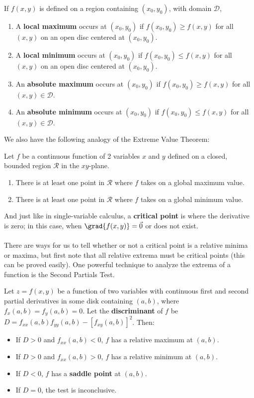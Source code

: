 \documentclass[12pt]{article}
\begin{document}
If $f(x,y)$ is defined on a region containing $(x_0,y_0)$, with domain $\mathcal{D}$,
\begin{enumerate}
\item A \textbf{local maximum} occurs at $(x_0,y_0)$ if $f(x_0,y_0) \ge f(x,y)$ for all $(x,y)$ on an open disc centered at $(x_0,y_0)$.
\item A \textbf{local minimum} occurs at $(x_0,y_0)$ if $f(x_0,y_0) \le f(x,y)$ for all $(x,y)$ on an open disc centered at $(x_0,y_0)$.
\item An \textbf{absolute maximum} occurs at $(x_0,y_0)$ if $f(x_0,y_0) \ge f(x,y)$ for all $(x,y) \in \mathcal{D}$.
\item An \textbf{absolute minimum} occurs at $(x_0,y_0)$ if $f(x_0,y_0) \le f(x,y)$ for all $(x,y) \in \mathcal{D}$.
\end{enumerate}

We also have the following analogy of the Extreme Value Theorem:
\begin{theorem}
Let $f$ be a continuous function of 2 variables $x$ and $y$ defined on a closed, bounded region $\mathcal{R}$ in the $xy$-plane.
\begin{enumerate}
\item There is at least one point in $\mathcal{R}$ where $f$ takes on a global maximum value.
\item There is at least one point in $\mathcal{R}$ where $f$ takes on a global minimum value.
\end{enumerate}
\end{theorem}

And just like in single-variable calculus, a \textbf{critical point} is where the derivative is zero; in this case, when $\grad{f(x,y)} = \vec{0}$ or does not exist. \\ \\
There are ways for us to tell whether or not a critical point is a relative minima or maxima, but first note that all relative extrema must be critical points (this can be proved easily). One powerful technique to analyze the extrema of a function is the Second Partials Test.
\begin{theorem}
Let $z = f(x,y)$ be a function of two variables with continuous first and second partial derivatives in some disk containing $(a,b)$, where $f_x(a,b) = f_y(a,b) = 0$. Let the \textbf{discriminant} of $f$ be $D = f_{xx}(a,b)f_{yy}(a,b) - [f_{xy}(a,b)]^2$. Then:
\begin{itemize}
\item If $D > 0$ and $f_{xx}(a,b) < 0$, $f$ has a relative maximum at $(a,b)$.
\item If $D > 0$ and $f_{xx}(a,b) > 0$, $f$ has a relative minimum at $(a,b)$.
\item If $D < 0$, $f$ has a \textbf{saddle point} at $(a,b)$.
\item If $D = 0$, the test is inconclusive.
\end{itemize}
\end{theorem}
\end{document}

